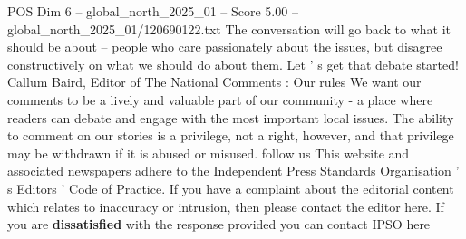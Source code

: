 \begin{textsample}{POS Dim 6 – global\_north\_2025\_01 – Score 5.00 – global\_north\_2025\_01/120690122.txt}
The conversation will go back to what it should be about -- people who care passionately about the issues, but disagree constructively on what we should do about them.
Let ' s get that debate started!
Callum Baird, Editor of The National Comments : Our rules We want our comments to be a lively and valuable part of our community - a place where readers can debate and engage with the most important local issues.
The ability to comment on our stories is a privilege, not a right, however, and that privilege may be withdrawn if it is abused or misused. follow us This website and associated newspapers adhere to the Independent Press Standards Organisation ' s Editors ' Code of Practice.
If you have a complaint about the editorial content which relates to inaccuracy or intrusion, then please contact the editor here.
If you are \textbf{dissatisfied} with the response provided you can contact IPSO here

\end{textsample}
